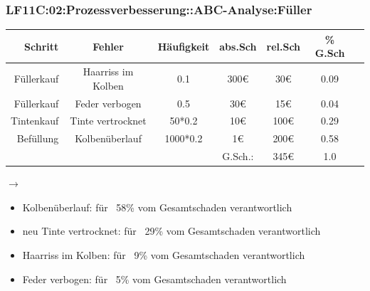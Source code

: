 \begin{frame}  
  \frametitle{LF11C:02:Prozessverbesserung::ABC-Analyse:Füller}
    \begin{center}

  \vspace{0.6cm}
  \begin{footnotesize}
  \renewcommand{\arraystretch}{1.5} 
  \begin{tabular}{|r|c|c|c|c|c|c|}
  \hline
  \textbf{Schritt} & \textbf{Fehler} & \textbf{Häufigkeit} & \textbf{abs.Sch} & \textbf{rel.Sch} & \textbf{\% G.Sch} \\ \hline
  Füllerkauf & Haarriss im Kolben & 0.1 & 300€ & 30€ & 0.09 \\ \hline
  Füllerkauf & Feder verbogen & 0.5 & 30€ & 15€ & 0.04\\ \hline \hline
  Tintenkauf & Tinte vertrocknet & 50*0.2 & 10€ & 100€ & 0.29\\ \hline \hline
  Befüllung & Kolbenüberlauf & 1000*0.2 & 1€ & 200€ &0.58\\ \hline
   &  &  & G.Sch.: & 345€ & 1.0\\ \hline
  \end{tabular}
  
  $\rightarrow$

  \begin{itemize}
    \item[A] Kolbenüberlauf: für ~58\% vom Gesamtschaden verantwortlich 
    \item[A] neu Tinte vertrocknet: für ~29\% vom Gesamtschaden verantwortlich
    \item[B] Haarriss im Kolben: für ~9\% vom Gesamtschaden verantwortlich
    \item[C] Feder verbogen: für ~5\% vom Gesamtschaden verantwortlich
  \end{itemize}
  \end{footnotesize}

\end{center}
\end{frame}

